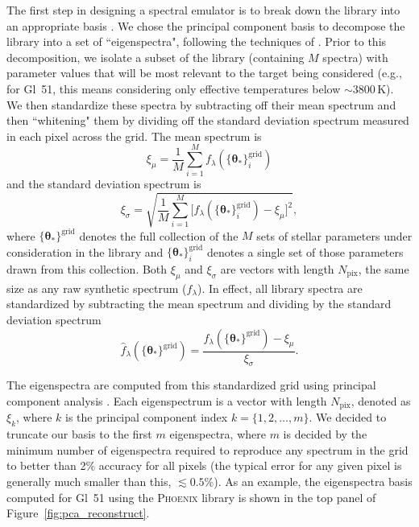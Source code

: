 \documentclass[iop,floatfix,numberedappendix,twocolappendix]{emulateapj}
\newcommand{\vt}{ {\bm \theta}}
\begin{document}
The first step in designing a spectral emulator is to break down the library into an appropriate 
basis \citep{habib07, heitmann09}.  We chose the principal component basis to decompose the library 
into a set of ``eigenspectra", following the techniques of \citet{ivezic13}.  Prior to this 
decomposition, we isolate a subset of the library (containing $M$ spectra) with parameter values 
that will be most relevant to the target being considered (e.g., for Gl~51, this means considering 
only effective temperatures below $\sim$3800\,K).  We then standardize these spectra by subtracting 
off their mean spectrum and then ``whitening" them by dividing off the standard deviation spectrum 
measured in each pixel across the grid.  The mean spectrum is 
\begin{equation}
  \xi_\mu = \frac{1}{M} \sum_{i = 1}^M f_\lambda(\{\vt_\ast \}^\textrm{grid}_i)
\end{equation}
and the standard deviation spectrum is
\begin{equation}
  \xi_\sigma = \sqrt{\frac{1}{M} \sum_{i=1}^M \bigl [ f_\lambda(\{\vt_\ast \}^\textrm{grid}_i) - \xi_\mu \bigr]^2 }, 
\end{equation}
where $\{\vt_\ast \}^\textrm{grid}$ denotes the full collection of the $M$ sets of stellar 
parameters under consideration in the library and $\{\vt_\ast \}^\textrm{grid}_i$ denotes a single 
set of those parameters drawn from this collection. Both $\xi_\mu$ and $\xi_\sigma$ are
vectors with length $N_\textrm{pix}$, the same size as any
raw synthetic spectrum ($f_\lambda$). In effect, all library spectra are 
standardized by subtracting the mean spectrum and dividing by the standard deviation spectrum
\begin{equation}
  \hat{f}_\lambda(\{\vt_\ast \}^\textrm{grid}) = \frac{f_\lambda(\{\vt_\ast \}^\textrm{grid}) - \xi_\mu}{\xi_\sigma}.
\end{equation}

The eigenspectra are computed from this standardized grid using principal component analysis
\citep[PCA;][]{ivezic13}. Each eigenspectrum is a vector with length $N_\textrm{pix}$, denoted as
$\xi_k$, where $k$ is the principal component index $k = \{1, 2, \ldots, m\}$. We decided to
truncate our basis to the first $m$ eigenspectra, where $m$ is decided by the minimum number of
eigenspectra required to reproduce any spectrum in the grid to better than 2\% accuracy for all
pixels (the typical error for any given pixel is generally much smaller than this, $\lesssim
0.5\%$). As an example, the eigenspectra basis computed for Gl~51 using the \textsc{Phoenix} library
is shown in the top panel of Figure~\ref{fig:pca_reconstruct}.
\end{document}
